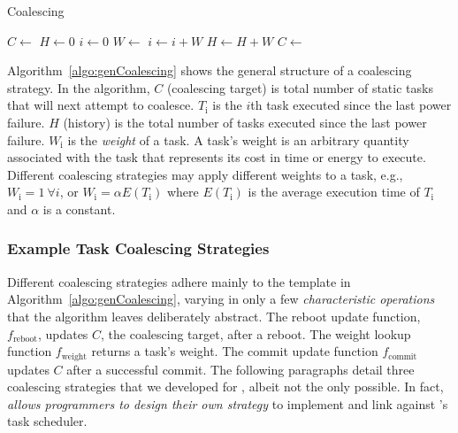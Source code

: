 \begin{algorithm}[t]
	\caption{Coalescing}
	\label{algo:genCoalescing}
	\small
	\begin{algorithmic}[1]
        \State $C \leftarrow $  
        \State $H \gets 0$ 
	        \State $ i \gets 0$
		        \State {}
		        \State $W \leftarrow $  
		        \State $i \gets i + W$
				\State $H \gets H + W$
	        \EndWhile
	        \State {}
                \State $C \leftarrow $  
        \EndWhile
	\end{algorithmic}
\end{algorithm}

Algorithm~\ref{algo:genCoalescing} shows the general structure of a coalescing strategy. In the algorithm, $C$ (coalescing target) is total number of static tasks that \sys will next attempt to coalesce. $T_\text{i}$ is the $i$th task executed since the last power failure. $H$ (history) is the total number of tasks executed since the last power failure. $W_\text{i}$ is the {\em weight} of a task. A task's weight is an arbitrary quantity associated with the task that represents its cost in time or energy to execute. Different coalescing strategies may apply different weights to a task, e.g., $W_\text{i} = 1\ \forall i$, or $W_\text{i} = \alpha E(T_\text{i})$ where $E(T_\text{i})$ is the average execution time of $T_\text{i}$ and $\alpha$ is a constant.

\subsubsection{Example Task Coalescing Strategies}
\label{subsec:coalescingStrategies}

Different coalescing strategies adhere mainly to the template in Algorithm~\ref{algo:genCoalescing}, varying in only a few {\em characteristic operations} that the algorithm leaves deliberately abstract. The reboot update function, $f_\text{reboot}$, updates $C$, the coalescing target, after a reboot. The weight lookup function $f_\text{weight}$ returns a task's weight. The commit update function $f_\text{commit}$ updates $C$ after a successful commit. The following paragraphs detail three coalescing strategies that we developed for \sys, albeit not the only possible. In fact, \sys \emph{allows programmers to design their own strategy} to implement and link against \sys's task scheduler. 

